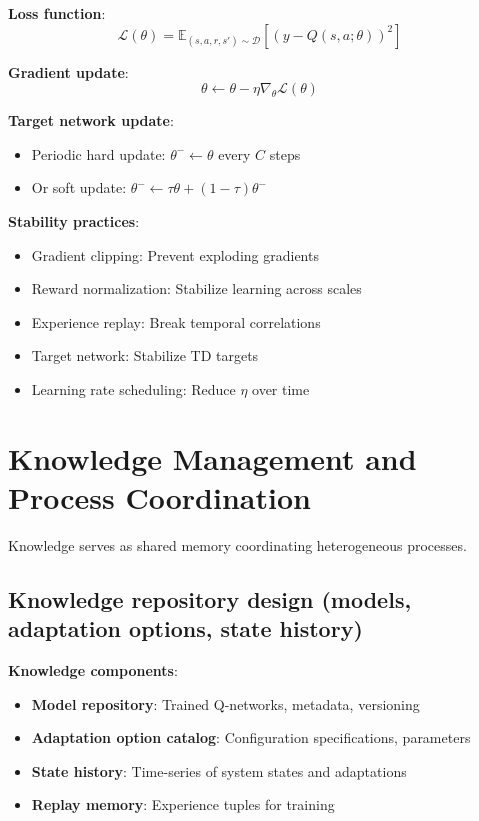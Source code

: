 \documentclass[11pt,a4paper]{article}
\begin{document}
\textbf{Loss function}:
\begin{equation}
\mathcal{L}(\theta) = \mathbb{E}_{(s,a,r,s') \sim \mathcal{D}} \left[ (y - Q(s,a;\theta))^2 \right]
\end{equation}

\textbf{Gradient update}:
\begin{equation}
\theta \leftarrow \theta - \eta \nabla_\theta \mathcal{L}(\theta)
\end{equation}

\textbf{Target network update}:
\begin{itemize}
    \item Periodic hard update: $\theta^- \leftarrow \theta$ every $C$ steps
    \item Or soft update: $\theta^- \leftarrow \tau \theta + (1-\tau) \theta^-$
\end{itemize}

\textbf{Stability practices}:
\begin{itemize}
    \item Gradient clipping: Prevent exploding gradients
    \item Reward normalization: Stabilize learning across scales
    \item Experience replay: Break temporal correlations
    \item Target network: Stabilize TD targets
    \item Learning rate scheduling: Reduce $\eta$ over time
\end{itemize}

\section{Knowledge Management and Process Coordination}

Knowledge serves as shared memory coordinating heterogeneous processes.

\subsection{Knowledge repository design (models, adaptation options, state history)}

\textbf{Knowledge components}:
\begin{itemize}
    \item \textbf{Model repository}: Trained Q-networks, metadata, versioning
    \item \textbf{Adaptation option catalog}: Configuration specifications, parameters
    \item \textbf{State history}: Time-series of system states and adaptations
    \item \textbf{Replay memory}: Experience tuples for training
\end{itemize}
\end{document}
